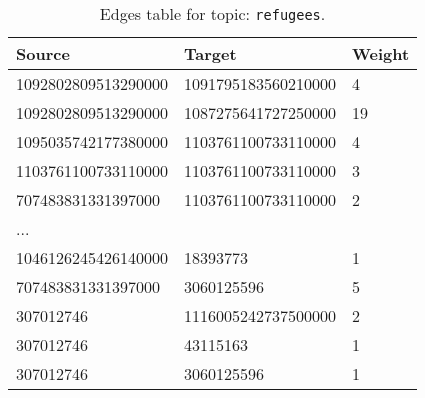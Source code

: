 %
%
\begin{table}[H]
  \small
  \caption{Edges table for topic: \texttt{refugees}.}\label{edgestable}
  \begin{center}
  \begin{tabular}{ l l l }
  \hline
  Source & Target & Weight\\
  \hline
  1092802809513290000	& 1091795183560210000	& 4\\
  1092802809513290000	& 1087275641727250000	& 19\\
  1095035742177380000	& 1103761100733110000	& 4\\
  1103761100733110000	& 1103761100733110000	& 3\\
  707483831331397000	& 1103761100733110000	& 2\\
  ... & &\\
  1046126245426140000 & 18393773 & 1\\
  707483831331397000 & 3060125596 & 5\\
  307012746 & 1116005242737500000 & 2\\
  307012746 & 43115163 & 1\\
  307012746 & 3060125596 & 1\\
  \hline
  \end{tabular}
  \end{center}
\end{table}

